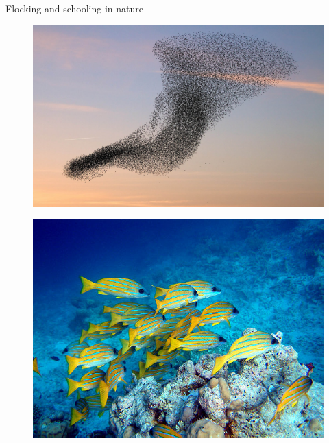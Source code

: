 \begin{frame}{Flocking and schooling in nature}

\begin{minipage}{0.45\textwidth}	
	\begin{figure}
		\includegraphics[width=\textwidth]{figures/flock_of_birds.jpg}
	\end{figure}
\end{minipage}
\hspace{0.05cm}
\begin{minipage}{0.45\textwidth}	
	\begin{figure}
		\includegraphics[width=\textwidth]{figures/schooling_fish.jpg}
	\end{figure}

\end{minipage}
\end{frame}
